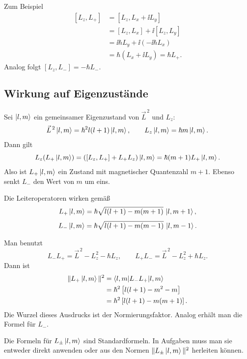 \begin{proofbox}
Zum Beispiel
\[
\begin{aligned}
    [L_z,L_+]
    &= [L_z,L_x+\ii L_y]\\
    &= [L_z,L_x]+\ii[L_z,L_y]\\
    &= \ii\hbar L_y+\ii(-\ii\hbar L_x)\\
    &= \hbar(L_x+\ii L_y)=\hbar L_+.
\end{aligned}
\]
Analog folgt \([L_z,L_-]=-\hbar L_-\).
\end{proofbox}

\subsection{Wirkung auf Eigenzustände}

Sei \(\left|l,m\right\rangle\) ein gemeinsamer Eigenzustand von \(\vec L^{\,2}\) und \(L_z\):
\[
    \vec L^{\,2}\left|l,m\right\rangle=\hbar^2 l(l+1)\left|l,m\right\rangle,
    \qquad
    L_z\left|l,m\right\rangle=\hbar m\left|l,m\right\rangle.
\]
Dann gilt
\[
    L_z(L_+\left|l,m\right\rangle)
    =([L_z,L_+]+L_+L_z)\left|l,m\right\rangle
    =\hbar(m+1)L_+\left|l,m\right\rangle.
\]
Also ist \(L_+\left|l,m\right\rangle\) ein Zustand mit magnetischer Quantenzahl \(m+1\). Ebenso senkt \(L_-\) den Wert von \(m\) um eins.

\begin{satzbox}
Die Leiteroperatoren wirken gemäß
\[
    L_+\left|l,m\right\rangle
    =\hbar\sqrt{l(l+1)-m(m+1)}\,\left|l,m+1\right\rangle,
\]
\[
    L_-\left|l,m\right\rangle
    =\hbar\sqrt{l(l+1)-m(m-1)}\,\left|l,m-1\right\rangle.
\]
\end{satzbox}

\begin{derivationbox}
Man benutzt
\[
    L_-L_+ = \vec L^{\,2}-L_z^2-\hbar L_z,
    \qquad
    L_+L_- = \vec L^{\,2}-L_z^2+\hbar L_z.
\]
Dann ist
\[
\begin{aligned}
    \|L_+\left|l,m\right\rangle\|^2
    &=\left\langle l,m\middle|L_-L_+\middle|l,m\right\rangle\\
    &=\hbar^2\left[l(l+1)-m^2-m\right]\\
    &=\hbar^2\left[l(l+1)-m(m+1)\right].
\end{aligned}
\]
Die Wurzel dieses Ausdrucks ist der Normierungsfaktor. Analog erhält man die Formel für \(L_-\).
\end{derivationbox}

\begin{examtipbox}
Die Formeln für \(L_\pm\left|l,m\right\rangle\) sind Standardformeln. In Aufgaben muss man sie entweder direkt anwenden oder aus den Normen \(\|L_\pm\left|l,m\right\rangle\|^2\) herleiten können.
\end{examtipbox}

